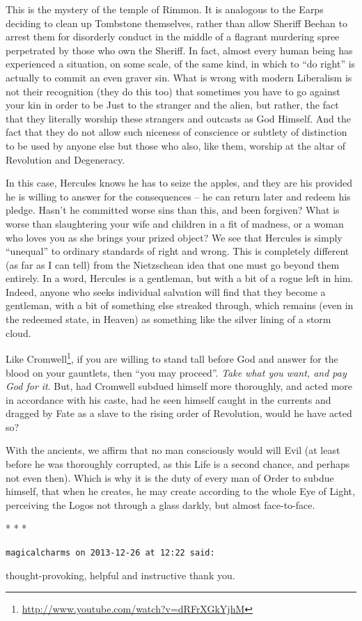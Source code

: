 This is the mystery of the temple of Rimmon. It is analogous to the Earps deciding to clean up Tombstone themselves, rather than allow Sheriff Beehan to arrest them for disorderly conduct in the middle of a flagrant murdering spree perpetrated by those who own the Sheriff. In fact, almost every human being has experienced a situation, on some scale, of the same kind, in which to ``do right'' is actually to commit an even graver sin. What is wrong with modern Liberalism is not their recognition (they do this too) that sometimes you have to go against your kin in order to be Just to the stranger and the alien, but rather, the fact that they literally worship these strangers and outcasts as God Himself. And the fact that they do not allow such niceness of conscience or subtlety of distinction to be used by anyone else but those who also, like them, worship at the altar of Revolution and Degeneracy.

In this case, Hercules knows he has to seize the apples, and they are his provided he is willing to answer for the consequences -- he can return later and redeem his pledge. Hasn't he committed worse sins than this, and been forgiven? What is worse than slaughtering your wife and children in a fit of madness, or a woman who loves you as she brings your prized object? We see that Hercules is simply ``unequal'' to ordinary standards of right and wrong. This is completely different (as far as I can tell) from the Nietzschean idea that one must go beyond them entirely. In a word, Hercules is a gentleman, but with a bit of a rogue left in him. Indeed, anyone who seeks individual salvation will find that they become a gentleman, with a bit of something else streaked through, which remains (even in the redeemed state, in Heaven) as something like the silver lining of a storm cloud.

Like Cromwell\footnote{\url{http://www.youtube.com/watch?v=dRFrXGkYjhM}}, if you are willing to stand tall before God and answer for the blood on your gauntlets, then ``you may proceed''. \emph{Take what you want, and pay God for it}. But, had Cromwell subdued himself more thoroughly, and acted more in accordance with his caste, had he seen himself caught in the currents and dragged by Fate as a slave to the rising order of Revolution, would he have acted so?

With the ancients, we affirm that no man consciously would will Evil (at least before he was thoroughly corrupted, as this Life is a second chance, and perhaps not even then). Which is why it is the duty of every man of Order to subdue himself, that when he creates, he may create according to the whole Eye of Light, perceiving the Logos not through a glass darkly, but almost face-to-face.



\begin{center}* * *\end{center}

\begin{footnotesize}
\begin{sffamily}
\texttt{magicalcharms on 2013-12-26 at 12:22 said:}

thought-provoking, helpful and instructive thank you.


\hfill

\end{sffamily}
\end{footnotesize}

